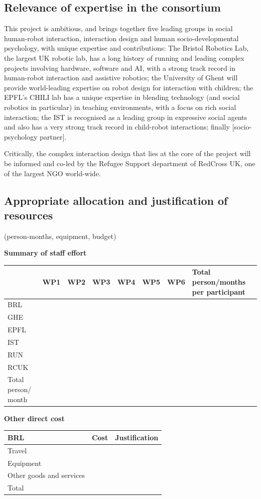 \documentclass[]{article}
\begin{document}
\subsection{Relevance of expertise in the consortium}\label{relevance-of-expertise-in-the-consortium}

This project is ambitious, and brings together five leading groups in
social human-robot interaction, interaction design and human
socio-developmental psychology, with unique expertise and contributions:
The Bristol Robotics Lab, the largest UK robotic lab, has a long history
of running and leading complex projects involving hardware, software and
AI, with a strong track record in human-robot interaction and assistive
robotics; the University of Ghent will provide world-leading expertise
on robot design for interaction with children; the EPFL's CHILI lab has
a unique expertise in blending technology (and social robotics in
particular) in teaching environments, with a focus on rich social
interaction; the IST is recognised as a leading group in expressive
social agents and also has a very strong track record in child-robot
interactions; finally {[}socio-psychology partner{]}.

Critically, the complex interaction design that lies at the core of the
project will be informed and co-led by the Refugee Support department of
RedCross UK, one of the largest NGO world-wide.

\subsection{Appropriate allocation and justification of resources}\label{appropriate-allocation-and-justification-of-resources}

(person-months, equipment, budget)

\textbf{Summary of staff effort}

\begin{longtable}[]{@{}llllllll@{}}
\toprule
& WP1 & WP2 & WP3 & WP4 & WP5 & WP6 & Total person/months per
participant\tabularnewline
\midrule
\endhead
BRL & & & & & & &\tabularnewline
GHE & & & & & & &\tabularnewline
EPFL & & & & & & &\tabularnewline
IST & & & & & & &\tabularnewline
RUN & & & & & & &\tabularnewline
RCUK & & & & & & &\tabularnewline
Total person/ month & & & & & & &\tabularnewline
\bottomrule
\end{longtable}

\textbf{Other direct cost}

\begin{longtable}[]{@{}lll@{}}
\toprule
BRL & Cost & Justification\tabularnewline
\midrule
\endhead
Travel & &\tabularnewline
Equipment & &\tabularnewline
Other goods and services & &\tabularnewline
Total & &\tabularnewline
\bottomrule
\end{longtable}
\end{document}
